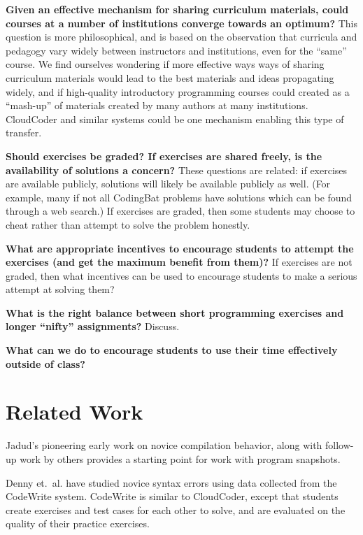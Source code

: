 \documentclass{sig-alternate}
\begin{document}
{\bf Given an effective mechanism for sharing curriculum materials, could
courses at a number of institutions converge towards an optimum?}
This question is more philosophical, and is based on the observation that
curricula and pedagogy vary widely between instructors and institutions,
even for the ``same'' course\cite{Hertz:2010:CCM:1734263.1734335}.  We find ourselves wondering
if more effective ways ways of sharing curriculum materials would lead
to the best materials and ideas propagating widely, and if high-quality introductory
programming courses could created as a ``mash-up'' of materials created by
many authors at many institutions.  CloudCoder and similar systems
could be one mechanism enabling this type of transfer.

{\bf Should exercises be graded?
If exercises are shared freely, is the availability of solutions a concern?}
These questions are related: if exercises are available publicly,
solutions will likely be available publicly as well.  (For example,
many if not all CodingBat problems have solutions which can be found
through a web search.)  If exercises are graded, then some students may
choose to cheat rather than attempt to solve the problem honestly.

{\bf What are appropriate incentives to encourage students to attempt
the exercises (and get the maximum benefit from them)?}
If exercises are not graded, then what incentives can be used to
encourage students to make a serious attempt at solving them?

{\bf What is the right balance between short programming exercises and
  longer ``nifty'' assignments?}
Discuss.

{\bf What can we do to encourage students to use their time effectively outside of class?}

\section{Related Work}

Jadud's pioneering early work on novice compilation
behavior\cite{Jadud:2006:MTE:1151588.1151600}, along with follow-up work by
others\cite{Norris:2008:CCQ:1384271.1384284} provides a starting point for
work with program snapshots.

Denny et.\ al. have studied novice syntax errors\cite{Denny:2012:SEE:2325296.2325318}
using data collected from the CodeWrite system.
CodeWrite is similar to CloudCoder, except that students create
exercises and test cases for each other to solve, and are evaluated on
the quality of their practice exercises.
\end{document}
